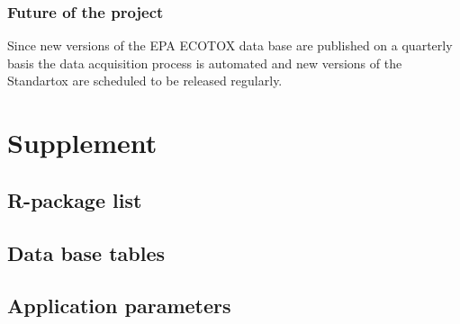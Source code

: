 \documentclass[english]{article}
\begin{document}
\subsubsection*{Future of the project}
Since new versions of the EPA ECOTOX data base are published on a quarterly basis the data acquisition process is automated and new versions of the Standartox are scheduled to be released regularly.




\pagebreak
\section*{Supplement}
\subsection*{R-package list} %
\label{list:r-packages}

\pagebreak

\subsection*{Data base tables}


\subsection*{Application parameters}

\end{document}
